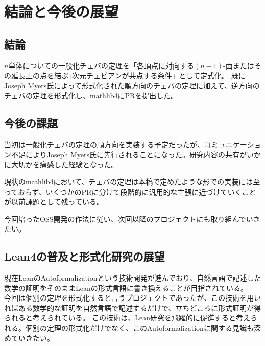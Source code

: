 \documentclass[a4paper,12pt]{bxjsbook}
\newlength{\customindent}
\newenvironment{body}{
  \par
  \begingroup
  \setlength{\leftskip}{\customindent}
  \setlength{\rightskip}{0pt}
  \setlength{\parindent}{1em}
  \setlength{\displayindent}{\customindent}
  \setlength{\displaywidth}{\dimexpr\linewidth-\customindent\relax}
}{
  \par
  \endgroup
}
\theoremstyle{theorem}
\begin{document}
\begin{body}
    \chapter{結論と今後の展望}

    \section{結論}
    \begin{body}
        \indent $n$単体についての一般化チェバの定理を「各頂点に対向する$(n-1)$-面またはその延長上の点を結ぶ$1$次元チェビアンが共点する条件」として定式化。
        既にJoseph Myers氏によって形式化された順方向のチェバの定理に加えて、逆方向のチェバの定理を形式化し、mathlib4にPRを提出した。
    \end{body}

    \section{今後の課題}
    \begin{body}
        \indent 当初は一般化チェバの定理の順方向を実装する予定だったが、コミュニケーション不足によりJoseph Myers氏に先行されることになった。研究内容の共有がいかに大切かを痛感した経験となった。

        \indent 現状のmathlib4において、チェバの定理は本稿で定めたような形での実装には至っておらず、いくつかのPRに分けて段階的に汎用的な主張に近づけていくことが以前課題として残っている。
        
        \indent 今回培ったOSS開発の作法に従い、次回以降のプロジェクトにも取り組んでいきたい。
    \end{body}

    \section{Lean4の普及と形式化研究の展望}
    \begin{body}
        \indent 現在LeanのAutoformalizationという技術開発が進んでおり、自然言語で記述した数学の証明をそのままLeanの形式言語に書き換えることが目指されている。\\
        今回は個別の定理を形式化すると言うプロジェクトであったが、この技術を用いればある数学的な証明を自然言語で記述するだけで、立ちどころに形式証明が得られると考えられている。
        この技術は、Lean研究を飛躍的に促進すると考えられる。個別の定理の形式化だけでなく、このAutoformalizationに関する見識も深めていきたい。
    \end{body}


\end{body}
\end{document}
